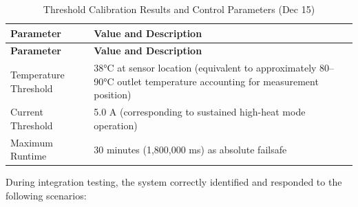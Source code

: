 \documentclass[11pt,a4paper]{article}
\begin{document}
\begin{longtable}{|p{}|p{}|}
\caption{Threshold Calibration Results and Control Parameters (Dec 15)}
\label{tab:control_thresholds} \\
\hline
\textbf{Parameter} & \textbf{Value and Description} \\
\hline
\endfirsthead
\hline
\textbf{Parameter} & \textbf{Value and Description} \\
\hline
\endhead
\hline
\endfoot
\hline
\endlastfoot
Temperature Threshold & 38°C at sensor location (equivalent to approximately 80--90°C outlet temperature accounting for measurement position) \\
\hline
Current Threshold & 5.0 A (corresponding to sustained high-heat mode operation) \\
\hline
Maximum Runtime & 30 minutes (1,800,000 ms) as absolute failsafe \\
\hline
\end{longtable}

\vspace{0.5em}
\noindent During integration testing, the system correctly identified and responded to the following scenarios:
\end{document}
